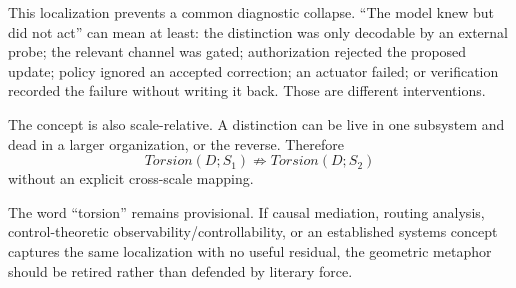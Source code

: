 This localization prevents a common diagnostic collapse. ``The model knew but did not act'' can mean at least: the distinction was only decodable by an external probe; the relevant channel was gated; authorization rejected the proposed update; policy ignored an accepted correction; an actuator failed; or verification recorded the failure without writing it back. Those are different interventions.

The concept is also scale-relative. A distinction can be live in one subsystem and dead in a larger organization, or the reverse. Therefore
\begin{equation}
Torsion(D;S_1)\not\Rightarrow Torsion(D;S_2)
\label{eq:deep-scale-torsion}
\end{equation}
without an explicit cross-scale mapping.

The word ``torsion'' remains provisional. If causal mediation, routing analysis, control-theoretic observability/controllability, or an established systems concept captures the same localization with no useful residual, the geometric metaphor should be retired rather than defended by literary force.
